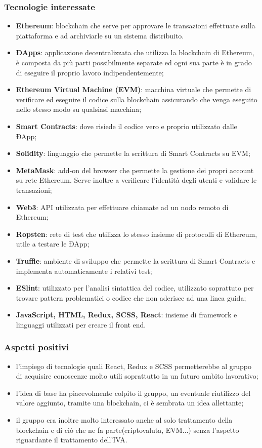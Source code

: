 \subsubsection{Tecnologie interessate}
\begin{itemize}
	\item \textbf{Ethereum}: blockchain che serve per approvare le transazioni effettuate sulla piattaforma e ad archiviarle su un sistema distribuito. 
	\item \textbf{ÐApps}: applicazione decentralizzata che utilizza la blockchain di Ethereum, è composta da più parti possibilmente separate ed ogni sua parte è in grado di eseguire il proprio lavoro indipendentemente; 
	\item \textbf{Ethereum Virtual Machine (EVM)}: macchina virtuale che permette di verificare ed eseguire il codice sulla blockchain assicurando che venga eseguito nello stesso modo su qualsiasi macchina;
	\item \textbf{Smart Contracts}: dove risiede il codice vero e proprio utilizzato dalle ÐApp;
	\item \textbf{Solidity}: linguaggio che permette la scrittura di Smart Contracts su EVM;
	\item \textbf{MetaMask}: add-on del browser che permette la gestione dei propri account su rete Ethereum. Serve inoltre a verificare l'identità degli utenti e validare le transazioni;
	\item \textbf{Web3}: API utilizzata per effettuare chiamate ad un nodo remoto di Ethereum;
	\item\textbf{Ropsten}: rete di test che utilizza lo stesso insieme di protocolli di Ethereum, utile a testare le ÐApp;
	\item\textbf{Truffle}: ambiente di sviluppo che permette la scrittura di Smart Contracts e implementa automaticamente i relativi test;
	\item\textbf{ESlint}: utilizzato per l'analisi sintattica del codice, utilizzato soprattuto per trovare pattern problematici o codice che non aderisce ad una linea guida;
	\item \textbf{JavaScript, HTML, Redux, SCSS, React}: insieme di framework e linguaggi utilizzati per creare il front end.
\end{itemize}

\subsubsection{Aspetti positivi} 
\begin{itemize}
	\item l'impiego di tecnologie quali React, Redux e SCSS permetterebbe al gruppo di acquisire conoscenze molto utili soprattutto in un futuro ambito lavorativo;	
	\item l'idea di base ha piacevolmente colpito il gruppo, un eventuale riutilizzo del valore aggiunto, tramite una blockchain, ci è sembrata un idea allettante;	
	\item il gruppo era inoltre molto interessato anche al solo trattamento della blockchain e di ciò che ne fa parte(criptovaluta, EVM...) senza l'aspetto riguardante il trattamento dell'IVA.
\end{itemize}

